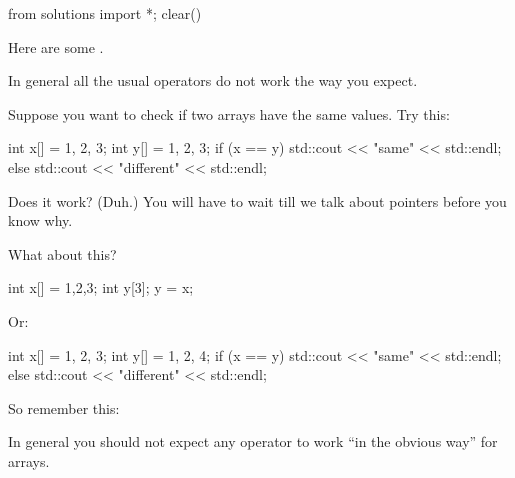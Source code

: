 \begin{python0}
from solutions import *; clear()
\end{python0}

Here are some .

In general all the usual operators do not work the way you expect.

Suppose you want to check if two arrays have the same values. Try this:

\begin{consolethree}[escapeinside=||]
int x[] = {1, 2, 3};
int y[] = {1, 2, 3};
if (x == y)
{
    std::cout << "same" << std::endl;
}
else
{
    std::cout << "different" << std::endl;
}
\end{consolethree}

Does it work? (Duh.) You will have to wait till we talk about pointers before you know why.

What about this?

\begin{consolethree}[escapeinside=||]
int x[] = {1,2,3};
int y[3];
y = x;
\end{consolethree}

Or:

\begin{consolethree}[escapeinside=||]
int x[] = {1, 2, 3};
int y[] = {1, 2, 4};
if (x == y)
    std::cout << "same" << std::endl;
else
    std::cout << "different" << std::endl;
\end{consolethree}

So remember this: 

In general you should not expect any operator to work ``in the obvious way'' for arrays.

